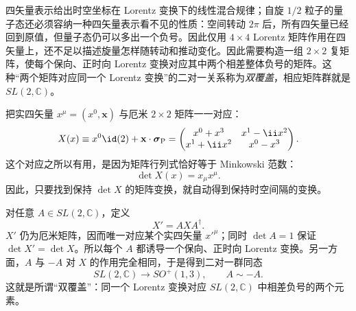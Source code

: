 四矢量表示给出时空坐标在 Lorentz 变换下的线性混合规律；自旋 $1/2$ 粒子的量子态还必须容纳一种四矢量表示看不见的性质：空间转动 $2\pi$ 后，所有四矢量已经回到原值，但量子态仍可以多出一个负号。因此仅用 $4\times4$ Lorentz 矩阵作用在四矢量上，还不足以描述旋量怎样随转动和推动变化。因此需要构造一组 $2\times2$ 复矩阵，使每个保向、正时向 Lorentz 变换对应其中两个相差整体负号的矩阵。这种“两个矩阵对应同一个 Lorentz 变换”的二对一关系称为\emph{双覆盖}，相应矩阵群就是 $SL(2,\mathbb C)$。


把实四矢量 $x^\mu=(x^0,\mathbf x)$ 与厄米 $2\times2$ 矩阵一一对应：
\begin{equation}
 X(x)\equiv x^0\id(2)+\mathbf x\cdot\boldsymbol\sigma_{\rm P}
 =\begin{pmatrix}
 x^0+x^3 & x^1-\ii x^2\\
 x^1+\ii x^2 & x^0-x^3
 \end{pmatrix}.
 \label{eq:sl2c-hermitian-map-dp8}
\end{equation}
这个对应之所以有用，是因为矩阵行列式恰好等于 Minkowski 范数：
\begin{equation}
 \boxed{\det X(x)=x_\mu x^\mu.}
 \label{eq:sl2c-det-minkowski-dp8}
\end{equation}
因此，只要找到保持 $\det X$ 的矩阵变换，就自动得到保持时空间隔的变换。

对任意 $A\in SL(2,\mathbb C)$，定义
\begin{equation}
 X' = A X A^\dagger.
 \label{eq:sl2c-action-X-dp8}
\end{equation}
$X'$ 仍为厄米矩阵，因而唯一对应某个实四矢量 $x'^\mu$；同时 $\det A=1$ 保证 $\det X'=\det X$。所以每个 $A$ 都诱导一个保向、正时向 Lorentz 变换。另一方面，$A$ 与 $-A$ 对 $X$ 的作用完全相同，于是得到二对一群同态
\begin{equation}
 \boxed{SL(2,\mathbb C)\longrightarrow SO^+(1,3),\qquad A\sim -A.}
 \label{eq:sl2c-double-cover-dp8}
\end{equation}
这就是所谓“双覆盖”：同一个 Lorentz 变换对应 $SL(2,\mathbb C)$ 中相差负号的两个元素。

